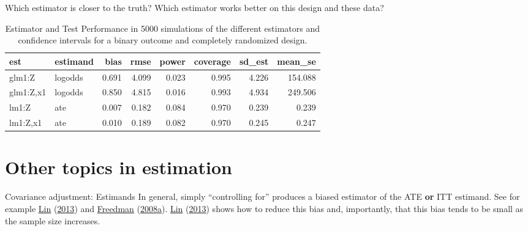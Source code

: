 \documentclass[
  ignorenonframetext,
]{beamer}
\begin{document}
\begin{frame}{Which estimator is closer to the truth?}
\protect\hypertarget{which-estimator-is-closer-to-the-truth-2}{}
Which estimator works better on this design and these data?

\scriptsize\normalsize

\scriptsize

\begin{table}

\caption{\label{tab:showresbin1}Estimator and Test Performance in 5000 simulations of the different estimators and confidence intervals for a binary outcome and completely randomized design.}
\centering
\begin{tabular}[t]{llrrrrrr}
\toprule
est & estimand & bias & rmse & power & coverage & sd\_est & mean\_se\\
\midrule
glm1:Z & logodds & 0.691 & 4.099 & 0.023 & 0.995 & 4.226 & 154.088\\
glm1:Z,x1 & logodds & 0.850 & 4.815 & 0.016 & 0.993 & 4.934 & 249.506\\
lm1:Z & ate & 0.007 & 0.182 & 0.084 & 0.970 & 0.239 & 0.239\\
lm1:Z,x1 & ate & 0.010 & 0.189 & 0.082 & 0.970 & 0.245 & 0.247\\
\bottomrule
\end{tabular}
\end{table}

\normalsize
\end{frame}

\hypertarget{other-topics-in-estimation}{%
\section{Other topics in estimation}\label{other-topics-in-estimation}}

\begin{frame}{Covariance adjustment: Estimands}
\protect\hypertarget{covariance-adjustment-estimands}{}
In general, simply ``controlling for'' produces a biased estimator of
the ATE \textbf{or} ITT estimand. See for example
\protect\hyperlink{ref-lin_agnostic_2013}{Lin}
(\protect\hyperlink{ref-lin_agnostic_2013}{2013}) and
\protect\hyperlink{ref-freedman2008rae}{Freedman}
(\protect\hyperlink{ref-freedman2008rae}{2008a}).
\protect\hyperlink{ref-lin_agnostic_2013}{Lin}
(\protect\hyperlink{ref-lin_agnostic_2013}{2013}) shows how to reduce
this bias and, importantly, that this bias tends to be small as the
sample size increases.
\end{frame}
\end{document}
